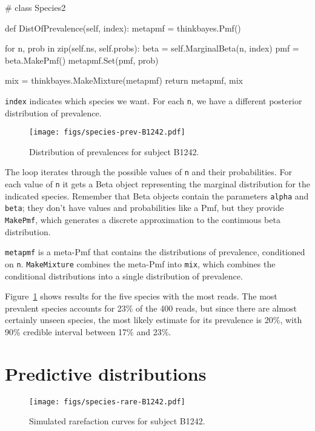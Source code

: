 \documentclass[12pt]{book}
\theoremstyle{exercise}
\newcommand{\py}[1]{{\tt #1}}%
\begin{document}
\begin{code}
# class Species2

    def DistOfPrevalence(self, index):
        metapmf = thinkbayes.Pmf()

        for n, prob in zip(self.ns, self.probs):
            beta = self.MarginalBeta(n, index)
            pmf = beta.MakePmf()
            metapmf.Set(pmf, prob)

        mix = thinkbayes.MakeMixture(metapmf)
        return metapmf, mix
\end{code}

\py{index} indicates which species we want.  For each
\py{n}, we have a different posterior distribution
of prevalence.

\begin{figure}
\centerline{\texttt{[image: figs/species-prev-B1242.pdf]}}
\caption{Distribution of prevalences for subject B1242.}
\label{species-prev}
\end{figure}

The loop iterates through the possible values of \py{n}
and their probabilities.  For each value of \py{n} it gets
a Beta object representing the marginal distribution for the
indicated species.  Remember that Beta objects contain the
parameters \py{alpha} and \py{beta}; they don't have
values and probabilities like a Pmf, but they provide \py{MakePmf},
which generates a discrete approximation to the continuous
beta distribution.

\py{metapmf} is a meta-Pmf that contains the distributions
of prevalence, conditioned on \py{n}.  \py{MakeMixture}
combines the meta-Pmf into \py{mix}, which combines the
conditional distributions into a single distribution
of prevalence.

Figure~\ref{species-prev} shows results for the five
species with the most reads.  The most prevalent species accounts for
23\% of the 400 reads, but since there are almost certainly unseen
species, the most likely estimate for its prevalence is 20\%,
with 90\% credible interval between 17\% and 23\%.


\section{Predictive distributions}

\begin{figure}
\centerline{\texttt{[image: figs/species-rare-B1242.pdf]}}
\caption{Simulated rarefaction curves for subject B1242.}
\label{species-rare}
\end{figure}
\end{document}
